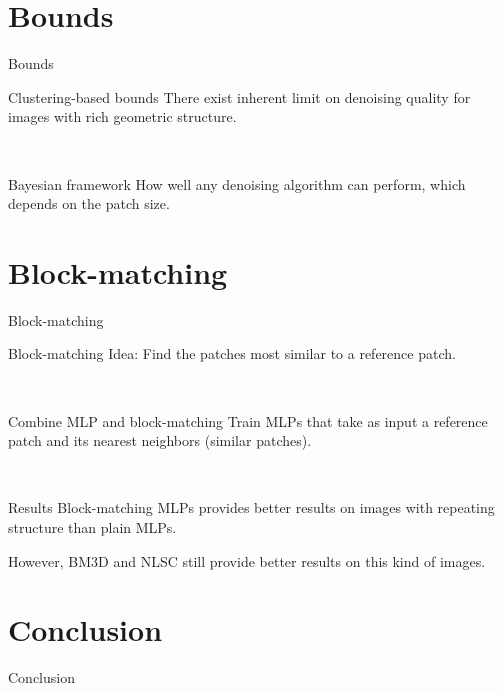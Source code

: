 \documentclass[8pt]{beamer}
\begin{document}
\section{Bounds}

\begin{frame}{Bounds}


\begin{block}{Clustering-based bounds}
There exist inherent limit on denoising quality for images with rich geometric structure.
\end{block}\

\begin{block}{Bayesian framework}
How well any denoising algorithm can perform, which depends on the patch size.
\end{block}

\end{frame}

\section{Block-matching}
\begin{frame}{Block-matching}
\begin{block}{Block-matching}
Idea: Find the patches most similar to a reference patch.
\end{block}\

\begin{block}{Combine MLP and block-matching}
Train MLPs that take as input a reference patch and its nearest neighbors (similar patches).
\end{block}\

\begin{block}{Results}
Block-matching MLPs provides better results on images with repeating structure than plain MLPs.

\vspace{0.5em}
However, BM3D and NLSC still provide better results on this kind of images.
\end{block}
\end{frame}






\section{Conclusion}

\begin{frame}{Conclusion}
\begin{block}{}

\end{block}
\end{frame}
\end{document}
